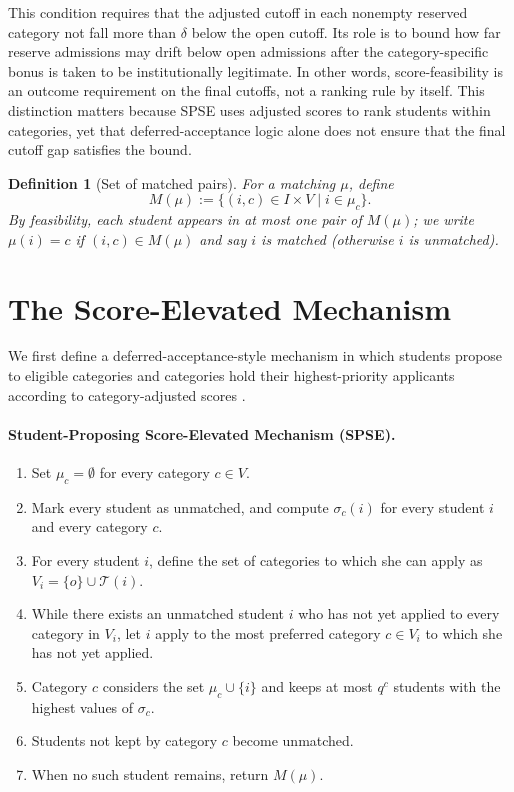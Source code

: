 \documentclass[10pt]{article}
\newtheorem{definition}{Definition}
\newcommand{\T}{\mathcal{T}}
\newcommand{\1}{\mathbf{1}}
\begin{document}
This condition requires that the adjusted cutoff in each nonempty reserved category not fall more than $\delta$ below the open cutoff. Its role is to bound how far reserve admissions may drift below open admissions after the category-specific bonus is taken to be institutionally legitimate. In other words, score-feasibility is an outcome requirement on the final cutoffs, not a ranking rule by itself. This distinction matters because SPSE uses adjusted scores to rank students within categories, yet that deferred-acceptance logic alone does not ensure that the final cutoff gap satisfies the bound.

\begin{definition}[Set of matched pairs]
For a matching $\mu$, define
\[
M(\mu) := \{(i,c)\in I\times V \mid i\in \mu_c\}.
\]
By feasibility, each student appears in at most one pair of $M(\mu)$; we write $\mu(i)=c$ if $(i,c)\in M(\mu)$ and say $i$ is \emph{matched} (otherwise $i$ is \emph{unmatched}).
\end{definition}

\section{The Score-Elevated Mechanism}

We first define a deferred-acceptance-style mechanism in which students propose to eligible categories and categories hold their highest-priority applicants according to category-adjusted scores \citep{GaSh62a,Roth08a}.

\paragraph{Student-Proposing Score-Elevated Mechanism (SPSE).}
\begin{enumerate}
\item Set $\mu_c=\emptyset$ for every category $c\in V$.
\item Mark every student as unmatched, and compute $\sigma_c(i)$ for every student $i$ and every category $c$.
\item For every student $i$, define the set of categories to which she can apply as $V_i=\{o\}\cup\T(i)$.
\item While there exists an unmatched student $i$ who has not yet applied to every category in $V_i$, let $i$ apply to the most preferred category $c\in V_i$ to which she has not yet applied.
\item Category $c$ considers the set $\mu_c\cup\{i\}$ and keeps at most $q^c$ students with the highest values of $\sigma_c$.
\item Students not kept by category $c$ become unmatched.
\item When no such student remains, return $M(\mu)$.
\end{enumerate}
\end{document}

